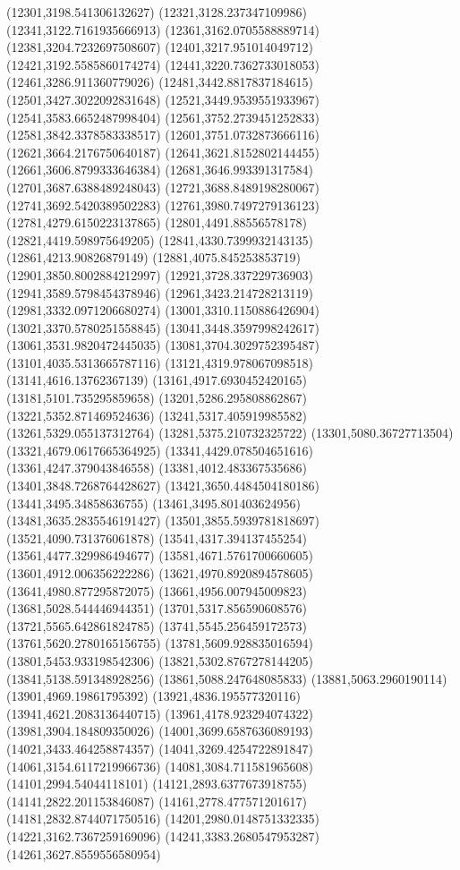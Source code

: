 {(12301,3198.541306132627)
(12321,3128.237347109986)
(12341,3122.7161935666913)
(12361,3162.0705588889714)
(12381,3204.7232697508607)
(12401,3217.951014049712)
(12421,3192.5585860174274)
(12441,3220.7362733018053)
(12461,3286.911360779026)
(12481,3442.8817837184615)
(12501,3427.3022092831648)
(12521,3449.9539551933967)
(12541,3583.6652487998404)
(12561,3752.2739451252833)
(12581,3842.3378583338517)
(12601,3751.0732873666116)
(12621,3664.2176750640187)
(12641,3621.8152802144455)
(12661,3606.8799333646384)
(12681,3646.993391317584)
(12701,3687.6388489248043)
(12721,3688.8489198280067)
(12741,3692.5420389502283)
(12761,3980.7497279136123)
(12781,4279.6150223137865)
(12801,4491.88556578178)
(12821,4419.598975649205)
(12841,4330.7399932143135)
(12861,4213.90826879149)
(12881,4075.845253853719)
(12901,3850.8002884212997)
(12921,3728.337229736903)
(12941,3589.5798454378946)
(12961,3423.214728213119)
(12981,3332.0971206680274)
(13001,3310.1150886426904)
(13021,3370.5780251558845)
(13041,3448.3597998242617)
(13061,3531.9820472445035)
(13081,3704.3029752395487)
(13101,4035.5313665787116)
(13121,4319.978067098518)
(13141,4616.13762367139)
(13161,4917.6930452420165)
(13181,5101.735295859658)
(13201,5286.295808862867)
(13221,5352.871469524636)
(13241,5317.405919985582)
(13261,5329.055137312764)
(13281,5375.210732325722)
(13301,5080.36727713504)
(13321,4679.0617665364925)
(13341,4429.078504651616)
(13361,4247.379043846558)
(13381,4012.483367535686)
(13401,3848.7268764428627)
(13421,3650.4484504180186)
(13441,3495.34858636755)
(13461,3495.801403624956)
(13481,3635.2835546191427)
(13501,3855.5939781818697)
(13521,4090.731376061878)
(13541,4317.394137455254)
(13561,4477.329986494677)
(13581,4671.5761700660605)
(13601,4912.006356222286)
(13621,4970.8920894578605)
(13641,4980.877295872075)
(13661,4956.007945009823)
(13681,5028.544446944351)
(13701,5317.856590608576)
(13721,5565.642861824785)
(13741,5545.256459172573)
(13761,5620.2780165156755)
(13781,5609.928835016594)
(13801,5453.933198542306)
(13821,5302.8767278144205)
(13841,5138.591348928256)
(13861,5088.247648085833)
(13881,5063.2960190114)
(13901,4969.19861795392)
(13921,4836.195577320116)
(13941,4621.2083136440715)
(13961,4178.923294074322)
(13981,3904.184809350026)
(14001,3699.6587636089193)
(14021,3433.464258874357)
(14041,3269.4254722891847)
(14061,3154.6117219966736)
(14081,3084.711581965608)
(14101,2994.54044118101)
(14121,2893.6377673918755)
(14141,2822.201153846087)
(14161,2778.477571201617)
(14181,2832.8744071750516)
(14201,2980.0148751332335)
(14221,3162.7367259169096)
(14241,3383.2680547953287)
(14261,3627.8559556580954)
}
